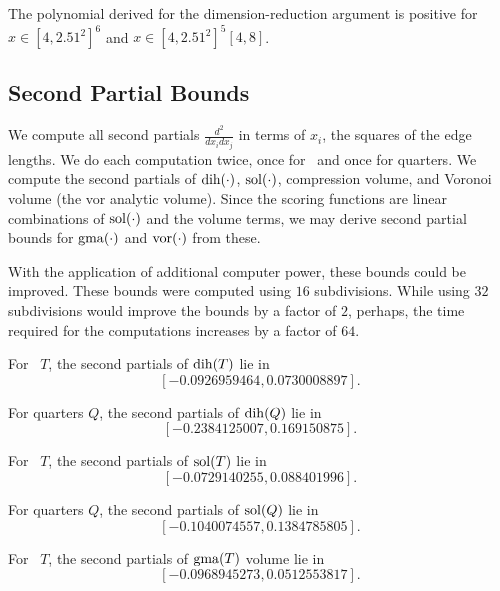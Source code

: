 \begin{calcf}
The polynomial derived for the dimension-reduction argument is
positive for $x \in [4,2.51^2]^6$ and $x \in [4,2.51^2]^5[4,8]$.
\label{d:dimred}
\end{calcf}


\subsection{Second Partial Bounds}
We compute all second partials $\frac{d^2}{dx_i dx_j}$ in terms of
$x_i$, the squares of the edge lengths.  We do each computation
twice, once for \qrtets\ and once for quarters.  We compute the
second partials of $\operatorname{dih}(\cdot)$, $\operatorname{sol}(\cdot)$, compression volume, and Voronoi
volume (the vor analytic volume).  Since the scoring functions
are linear combinations of $\operatorname{sol}(\cdot)$ and the volume terms, we may
derive second partial bounds for $\operatorname{gma}(\cdot)$ and $\operatorname{vor}(\cdot)$ from these.

With the application of additional computer power, these
bounds could be improved.  These bounds were computed using
$16$ subdivisions.  While using $32$ subdivisions would improve
the bounds by a factor of $2$, perhaps, the time required
for the computations increases by a factor of $64$.

\begin{calcf}
For \qrtets\ $T$, the second partials of $\operatorname{dih}(T)$ lie in
\[
[-0.0926959464,  0.0730008897].
\]
\label{secpar:dih:qr}
\end{calcf}

\begin{calcf}
For quarters $Q$, the second partials of $\operatorname{dih}(Q)$ lie in
\[
[-0.2384125007,   0.169150875].
\]
\label{secpar:dih}
\end{calcf}

\begin{calcf}
For \qrtets\ $T$, the second partials of $\operatorname{sol}(T)$ lie in
\[
[-0.0729140255,  0.088401996].
\]
\label{secpar:sol:qr}
\end{calcf}

\begin{calcf}
For quarters $Q$, the second partials of $\operatorname{sol}(Q)$ lie in
\[
[-0.1040074557,   0.1384785805].
\]
\label{secpar:sol}
\end{calcf}

\begin{calcf}
For \qrtets\ $T$, the second partials of $\operatorname{gma}(T)$ volume lie in
\[
[-0.0968945273,  0.0512553817].
\]
\label{secpar:gma:qr}
\end{calcf}

